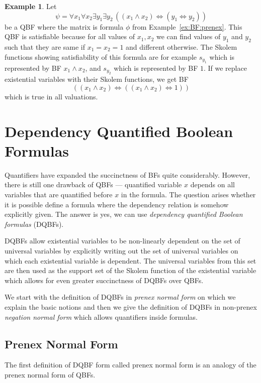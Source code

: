 \documentclass[
  digital, %
  color,
  twoside, %
  table,   %
  nolof,     %
  nolot,     %
]{fithesis3}
\theoremstyle{definition}
\newtheorem{example}{Example}
\theoremstyle{remark}
\newcommand{\lequal}{\Leftrightarrow}
\newcommand{\itholds}{\,}
\begin{document}
\begin{example}
\label{ex:QBF:prenex}
Let 
\[\psi = \forall x_1 \forall x_2 \exists y_1  \exists y_2 \itholds ((x_1 \land x_2) \lequal (y_1 \lequal y_2))\]
be a QBF where the matrix is formula $\phi$ from Example~\ref{ex:BF:prenex}. This QBF is satisfiable because for all values of $x_1, x_2$ we can find values of $y_1$ and $y_2$ such that they are same if $x_1 = x_2 = 1$ and different otherwise. The Skolem functions showing satisfiability of this formula are for example $s_{y_1}$ which is represented by BF $x_1 \land x_2$, and $s_{y_2}$ which is represented by BF $1$. If we replace existential variables with their Skolem functions, we get BF
\[((x_1 \land x_2) \lequal ((x_1 \land x_2) \lequal 1))\]
which is true in all valuations.
\end{example}

\section{Dependency Quantified Boolean Formulas}
Quantifiers have expanded the succinctness of BFs quite considerably. However, there is still one drawback of QBFs --- quantified variable $x$ depends on all variables that are quantified before $x$ in the formula. The question arises whether it is possible define a formula where the dependency relation is somehow explicitly given. The answer is yes, we can use \emph{dependency quantified Boolean formulas} (DQBFs).

DQBFs allow existential variables to be non-linearly dependent on the set of universal variables by explicitly writing out the set of universal variables on which each existential variable is dependent. The universal variables from this set are then used as the support set of the Skolem function of the existential variable which allows for even greater succinctness of DQBFs over QBFs.  

We start with the definition of DQBFs in \emph{prenex normal form} on which we explain the basic notions and then we give the definition of DQBFs in non-prenex \emph{negation normal form} which allows quantifiers inside formulas.

\subsection{Prenex Normal Form}
The first definition of DQBF form called prenex normal form is an analogy of the prenex normal form of QBFs.
\end{document}
